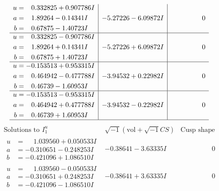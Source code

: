 \documentclass[1p]{elsarticle_modified}
\theoremstyle{definition}
\newcommand{\I}{\sqrt{-1}}
\begin{document}
$$\begin{array}{c|c|c}
\begin{aligned}
u &= \phantom{-}0.332825 + 0.907786 I \\
a &= \phantom{-}1.89264 - 0.14341 I \\
b &= \phantom{-}0.67875 - 1.40723 I\end{aligned}
 & -5.27226 - 6.09872 I & \phantom{-0.000000 } 0 \\ \hline\begin{aligned}
u &= \phantom{-}0.332825 - 0.907786 I \\
a &= \phantom{-}1.89264 + 0.14341 I \\
b &= \phantom{-}0.67875 + 1.40723 I\end{aligned}
 & -5.27226 + 6.09872 I & \phantom{-0.000000 } 0 \\ \hline\begin{aligned}
u &= -0.153513 + 0.953315 I \\
a &= \phantom{-}0.464942 - 0.477788 I \\
b &= \phantom{-}0.46739 - 1.60953 I\end{aligned}
 & -3.94532 + 0.22982 I & \phantom{-0.000000 } 0 \\ \hline\begin{aligned}
u &= -0.153513 - 0.953315 I \\
a &= \phantom{-}0.464942 + 0.477788 I \\
b &= \phantom{-}0.46739 + 1.60953 I\end{aligned}
 & -3.94532 - 0.22982 I & \phantom{-0.000000 } 0\\
 \hline 
 \end{array}$$\newpage$$\begin{array}{c|c|c}  
\text{Solutions to }I^u_{1}& \I (\text{vol} + \sqrt{-1}CS) & \text{Cusp shape}\\
 \hline 
\begin{aligned}
u &= \phantom{-}1.039560 + 0.050533 I \\
a &= -0.310651 - 0.248253 I \\
b &= -0.421096 + 1.086510 I\end{aligned}
 & -0.38641 - 3.63335 I & \phantom{-0.000000 } 0 \\ \hline\begin{aligned}
u &= \phantom{-}1.039560 - 0.050533 I \\
a &= -0.310651 + 0.248253 I \\
b &= -0.421096 - 1.086510 I\end{aligned}
 & -0.38641 + 3.63335 I & \phantom{-0.000000 } 0 \\ \hline\begin{aligned}

\end{aligned}
\end{array}$$
\end{document}
